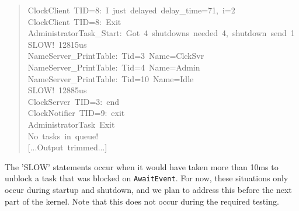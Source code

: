 \documentclass[letterpaper]{article}
\begin{document}
\begin{quote}
{ClockClient~TID=8:~I~just~delayed~delay\_time=71,~i=2\\
ClockClient~TID=8:~Exit\\
AdministratorTask\_Start:~Got~4~shutdowns~needed~4,~shutdown~send~1\\
SLOW!~12815us\\
NameServer\_PrintTable:~Tid=3~Name=ClckSvr\\
NameServer\_PrintTable:~Tid=4~Name=Admin\\
NameServer\_PrintTable:~Tid=10~Name=Idle\\
SLOW!~12885us\\
ClockServer~TID=3:~end\\
ClockNotifier~TID=9:~exit\\
AdministratorTask~Exit\\
No~tasks~in~queue!\\
{[}...Output~trimmed...{]}
}
\end{quote}

The 'SLOW' statements occur when it would have taken more than 10ms to unblock a task that was blocked on \texttt{AwaitEvent}.  For now, these situations only occur during startup and shutdown, and we plan to address this before the next part of the kernel.  Note that this does not occur during the required testing.
\end{document}

